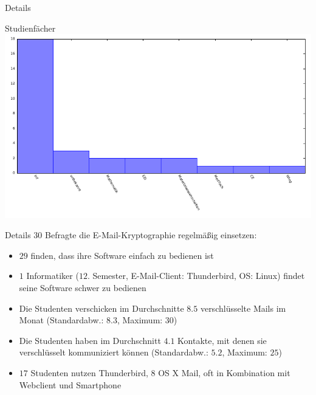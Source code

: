\documentclass[]{beamer}
\begin{document}
\begin{frame}{Details}
	\begin{center}
		Studienfächer
		\includegraphics[scale=0.9]{plots/reglm.pdf}
	\end{center}
\end{frame}

\begin{frame}{Details}
	$30$ Befragte die E-Mail-Kryptographie regelmäßig einsetzen:
  \begin{itemize}
	\item<2-> $29$ finden, dass ihre Software einfach zu bedienen ist
	\item<2-> $1$ Informatiker ($12.$ Semester, E-Mail-Client: Thunderbird, OS: Linux) findet seine Software schwer zu bedienen
	\item<3-> Die Studenten verschicken im Durchschnitte $8.5$ verschlüsselte Mails im Monat (Standardabw.: $8.3$, Maximum: $30$)
	\item<4-> Die Studenten haben im Durchschnitt $4.1$ Kontakte, mit denen sie verschlüsselt kommuniziert können
		(Standardabw.: $5.2$, Maximum: $25$)
	\item<5-> $17$ Studenten nutzen Thunderbird, $8$ OS X Mail, oft in Kombination mit Webclient und Smartphone
  \end{itemize}
\end{frame}


\end{document}

